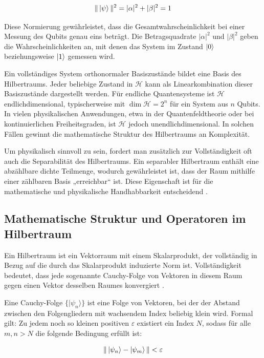 \[
\| \ket{\psi} \|^2 = |\alpha|^2 + |\beta|^2 = 1
\]

Diese Normierung gewährleistet, dass die Gesamtwahrscheinlichkeit bei einer Messung des Qubits genau eins beträgt. Die Betragsquadrate \( |\alpha|^2 \) und \( |\beta|^2 \) geben die Wahrscheinlichkeiten an, mit denen das System im Zustand \( \ket{0} \) beziehungsweise \( \ket{1}  \) gemessen wird.

Ein vollständiges System orthonormaler Basiszustände bildet eine Basis des Hilbertraums. Jeder beliebige Zustand in \( \mathcal{H} \) kann als Linearkombination dieser Basiszustände dargestellt werden. Für endliche Quantensysteme ist \( \mathcal{H} \) endlichdimensional, typischerweise mit \( \dim \mathcal{H} = 2^n \) für ein System aus \( n \) Qubits. In vielen physikalischen Anwendungen, etwa in der Quantenfeldtheorie oder bei kontinuierlichen Freiheitsgraden, ist \( \mathcal{H} \) jedoch unendlichdimensional. In solchen Fällen gewinnt die mathematische Struktur des Hilbertraums an Komplexität.

Um physikalisch sinnvoll zu sein, fordert man zusätzlich zur Vollständigkeit oft auch die Separabilität des Hilbertraums. Ein separabler Hilbertraum enthält eine abzählbare dichte Teilmenge, wodurch gewährleistet ist, dass der Raum mithilfe einer zählbaren Basis „erreichbar“ ist. Diese Eigenschaft ist für die mathematische und physikalische Handhabbarkeit entscheidend \cite{nolting_springer_2013}.  %

\subsection{Mathematische Struktur und Operatoren im Hilbertraum}

Ein Hilbertraum ist ein Vektorraum mit einem Skalarprodukt, der vollständig in Bezug auf die durch das Skalarprodukt induzierte Norm ist. Vollständigkeit bedeutet, dass jede sogenannte Cauchy-Folge von Vektoren in diesem Raum gegen einen Vektor desselben Raumes konvergiert \cite{nolting_springer_2013}.

Eine Cauchy-Folge \( \{ |\psi_n\rangle \} \) ist eine Folge von Vektoren, bei der der Abstand zwischen den Folgengliedern mit wachsendem Index beliebig klein wird. Formal gilt: Zu jedem noch so kleinen positiven \( \varepsilon \) existiert ein Index \( N \), sodass für alle \( m,n > N \) die folgende Bedingung erfüllt ist:

\[
\| \ket{\psi_n}  - \ket{\psi_m}  \| < \varepsilon
\]

